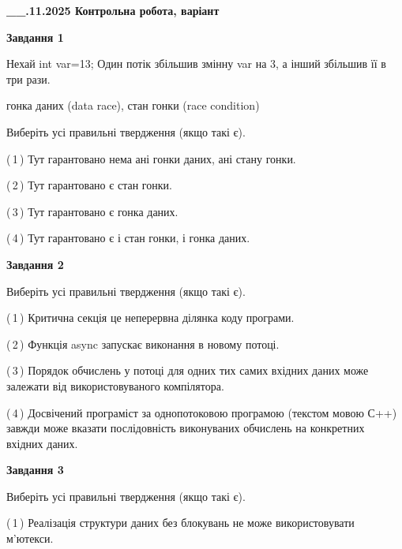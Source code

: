\documentclass[12pt, ukrainian]{article}
\begin{document}

\begin {large}

\textbf{\_\_.11.2025 Контрольна робота, варіант  }\par


{

\begin{center}
\textbf{Завдання 1}
\end{center}
Нехай int var=13; Один потік збільшив змінну var на 3, а інший збільшив її в три рази.

гонка даних (data race), стан гонки (race condition)

Виберіть усі правильні твердження (якщо такі є).\par
\vspace{2mm}
(\,1\,) Тут гарантовано нема ані гонки даних, ані стану гонки.%

(\,2\,) Тут гарантовано є стан гонки.%

(\,3\,) Тут гарантовано є гонка даних.%

(\,4\,) Тут гарантовано є і стан гонки, і гонка даних.%



\begin{center}
\textbf{Завдання 2}
\end{center}
Виберіть усі правильні твердження (якщо такі є).\par
\vspace{2mm}

(\,1\,) Критична секція це неперервна ділянка коду програми.%

(\,2\,) Функція async запускає виконання в новому потоці.%

(\,3\,) Порядок обчислень у потоці для одних тих самих вхідних даних може залежати від використовуваного компілятора.%

(\,4\,) Досвічений програміст за однопотоковою програмою (текстом мовою С++) завжди може вказати послідовність виконуваних обчислень на конкретних вхідних даних.%



\begin{center}
\textbf{Завдання 3}
\end{center}
Виберіть усі правильні твердження (якщо такі є).\par
\vspace{2mm}

(\,1\,) Реалізація структури даних без блокувань не може використовувати м’ютекси.%

}
\end{large}
\end{document}
